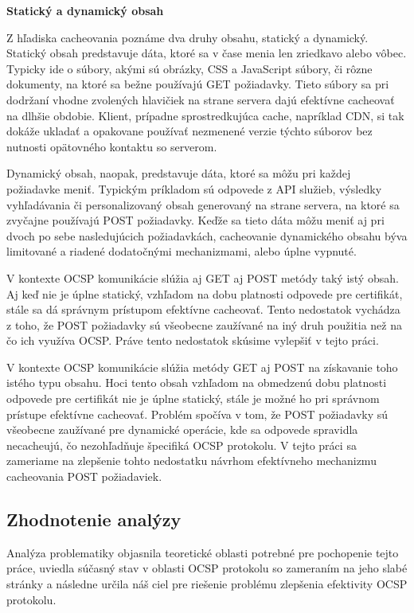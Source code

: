 \documentclass[12pt, twoside]{book}
\newcommand{\subsubsubsection}[1]{%
  \vspace{0.2em}  
  \textbf{#1} \\[0.2em]
  \hspace*{\parindent}
}
\begin{document}
\subsubsubsection{Statický a dynamický obsah}
Z hľadiska cacheovania poznáme dva druhy obsahu, statický a dynamický. Statický obsah predstavuje dáta, ktoré sa v čase menia len zriedkavo alebo vôbec. Typicky ide o súbory, akými sú obrázky, CSS a JavaScript súbory, či rôzne dokumenty, na ktoré sa bežne používajú GET požiadavky. Tieto súbory sa pri dodržaní vhodne zvolených hlavičiek na strane servera dajú efektívne cacheovať na dlhšie obdobie. Klient, prípadne sprostredkujúca cache, napríklad CDN, si tak dokáže ukladať a opakovane používať nezmenené verzie týchto súborov bez nutnosti opätovného kontaktu so serverom.

Dynamický obsah, naopak, predstavuje dáta, ktoré sa môžu pri každej požiadavke meniť. Typickým príkladom sú odpovede z API služieb, výsledky vyhľadávania či personalizovaný obsah generovaný na strane servera, na ktoré sa zvyčajne používajú POST požiadavky. Keďže sa tieto dáta môžu meniť aj pri dvoch po sebe nasledujúcich požiadavkách, cacheovanie dynamického obsahu býva limitované a riadené dodatočnými mechanizmami, alebo úplne vypnuté.

V kontexte OCSP komunikácie slúžia aj GET aj POST metódy taký istý obsah. Aj keď nie je úplne statický, vzhľadom na dobu platnosti odpovede pre certifikát, stále sa dá správnym prístupom efektívne cacheovať. Tento nedostatok vychádza z toho, že POST požiadavky sú všeobecne zaužívané na iný druh použitia než na čo ich využíva OCSP. Práve tento nedostatok skúsime vylepšiť v tejto práci.

V kontexte OCSP komunikácie slúžia metódy GET aj POST na získavanie toho istého typu obsahu. Hoci tento obsah vzhľadom na obmedzenú dobu platnosti odpovede pre certifikát nie je úplne statický, stále je možné ho pri správnom prístupe efektívne cacheovať. Problém spočíva v tom, že POST požiadavky sú všeobecne zaužívané pre dynamické operácie, kde sa odpovede spravidla necacheujú, čo nezohľadňuje špecifiká OCSP protokolu. V tejto práci sa zameriame na zlepšenie tohto nedostatku návrhom efektívneho mechanizmu cacheovania POST požiadaviek.


\subsection{Zhodnotenie analýzy}
Analýza problematiky objasnila teoretické oblasti potrebné pre pochopenie tejto práce, uviedla súčasný stav v oblasti OCSP protokolu so zameraním na jeho slabé stránky a následne určila náš ciel pre riešenie problému zlepšenia efektivity OCSP protokolu.
\end{document}
